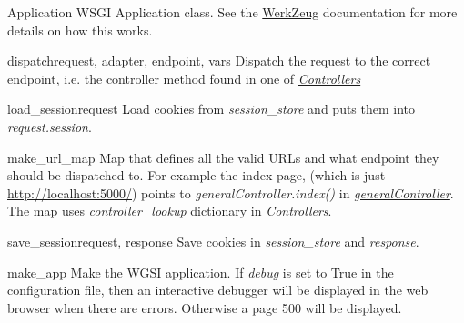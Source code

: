 \documentclass[letterpaper,10pt,english]{manual}
\begin{document}
\hypertarget{webscavator.application.Application}{}\begin{classdesc}{Application}{}
WSGI Application class. See the 
\href{http://werkzeug.pocoo.org/documentation/dev/tutorial.html}{WerkZeug} 
documentation for more details on how this works.

\hypertarget{webscavator.application.Application.dispatch}{}\begin{methoddesc}{dispatch}{request, adapter, endpoint, vars}
Dispatch the request to the correct endpoint, i.e. the controller method found in
one of \hyperlink{--doc-controllers}{\emph{Controllers}}
\end{methoddesc}

\hypertarget{webscavator.application.Application.load_session}{}\begin{methoddesc}{load\_session}{request}
Load cookies from \emph{session\_store} and puts them into \emph{request.session}.
\end{methoddesc}

\hypertarget{webscavator.application.Application.make_url_map}{}\begin{staticmethoddesc}{make\_url\_map}{}
Map that defines all the valid URLs and what endpoint they should be dispatched to. 
For example the index page, (which is just \href{http://localhost:5000/}{http://localhost:5000/}) points to
\emph{generalController.index()} in \hyperlink{--doc-generalController}{\emph{generalController}}. The map uses 
\emph{controller\_lookup} dictionary in \hyperlink{--doc-controllers}{\emph{Controllers}}.
\end{staticmethoddesc}

\hypertarget{webscavator.application.Application.save_session}{}\begin{methoddesc}{save\_session}{request, response}
Save cookies in \emph{session\_store} and \emph{response}.
\end{methoddesc}
\end{classdesc}

\hypertarget{webscavator.application.make_app}{}\begin{funcdesc}{make\_app}{}
Make the WGSI application. If \emph{debug} is set to True in the configuration file, 
then an interactive debugger will be 
displayed in the web browser when there are errors. Otherwise a page 500 will be 
displayed.
\end{funcdesc}
\end{document}
